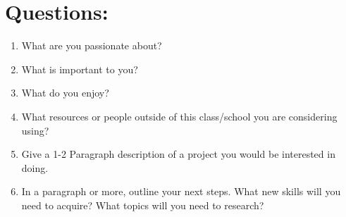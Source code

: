 

%
%

\newcommand{\hmwkTitle}{Final Project Proposal}
\newcommand{\hmwkDueDate}{September 20, 2024}
\newcommand{\hmwkDueTime}{11:59 PM}
\newcommand{\hmwkClass}{ENAE 380}
\newcommand{\hmwkClassTime}{0106}
\newcommand{\hmwkClassInstructor}{Dr. Mumu Xu}
\newcommand{\hmwkAuthorName}{Vai Srivastava}
\newcommand{\hmwkCompletionDate}{\today}



\maketitle

\pagebreak

\section{Questions:}
\begin{enumerate}
	\item What are you passionate about?
	\item What is important to you?
	\item What do you enjoy?
	\item What resources or people outside of this class/school you are considering using?
	\item Give a 1-2 Paragraph description of a project you would be interested in doing.
	\item In a paragraph or more, outline your next steps. What new skills will you need to acquire? What topics will you need to research?
\end{enumerate}

